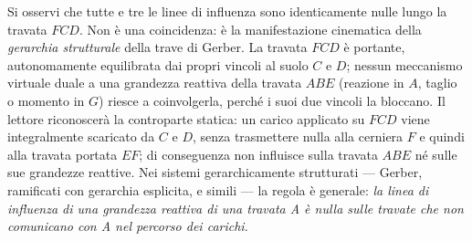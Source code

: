 \begin{esempio}
	\begin{oss}
		Si osservi che tutte e tre le linee di influenza sono
		identicamente nulle lungo la travata $FCD$. Non è una
		coincidenza: è la manifestazione cinematica della
		\emph{gerarchia strutturale} della trave di Gerber.
		La travata $FCD$ è portante, autonomamente
		equilibrata dai propri vincoli al suolo $C$ e $D$;
		nessun meccanismo virtuale duale a una grandezza
		reattiva della travata $ABE$ (reazione in $A$, taglio
		o momento in $G$) riesce a coinvolgerla, perché i suoi
		due vincoli la bloccano. Il lettore riconoscerà la
		controparte statica: un carico applicato su $FCD$
		viene integralmente scaricato da $C$ e $D$, senza
		trasmettere nulla alla cerniera $F$ e quindi alla
		travata portata $EF$; di conseguenza non influisce
		sulla travata $ABE$ né sulle sue grandezze reattive.
		Nei sistemi gerarchicamente strutturati --- Gerber,
		ramificati con gerarchia esplicita, e simili --- la
		regola è generale: \emph{la linea di influenza di una
			grandezza reattiva di una travata A è nulla sulle
			travate che non comunicano con A nel percorso dei
			carichi}.
	\end{oss}
	
\end{esempio}


